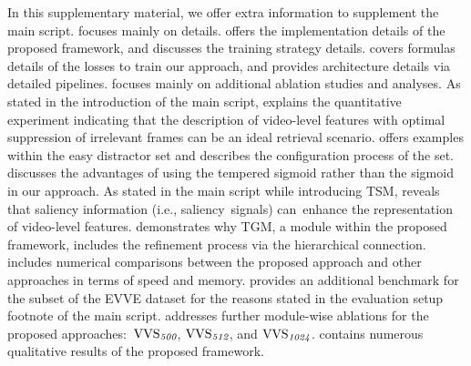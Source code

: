 \documentclass[10pt,twocolumn,letterpaper]{article}
\begin{document}
{\small


}

\clearpage

\appendix

\setcounter{figure}{0}
\setcounter{equation}{0}
\setcounter{table}{0}

\renewcommand\thefigure{\Alph{figure}}
\renewcommand\theequation{\roman{equation}}
\renewcommand\thetable{\Alph{table}}


\maketitle

In this supplementary material, we offer extra information to supplement the main script.  focuses mainly on details.  offers the implementation details of the proposed framework, and  discusses the training strategy details.  covers formulas details of the losses to train our approach, and  provides architecture details via detailed pipelines.  focuses mainly on additional ablation studies and analyses. As stated in the introduction of the main script,  explains the quantitative experiment indicating that the description of video-level features with optimal suppression of irrelevant frames can be an ideal retrieval scenario.  offers examples within the easy distractor set and describes the configuration process of the set.  discusses the advantages of using the tempered sigmoid rather than the sigmoid in our approach. As stated in the main script while introducing TSM,  reveals that saliency information (i.e., saliency signals) can enhance the representation of video-level features.  demonstrates why TGM, a module within the proposed framework, includes the refinement process via the hierarchical connection.  includes numerical comparisons between the proposed approach and other approaches in terms of speed and memory.  provides an additional benchmark for the subset of the EVVE dataset for the reasons stated in the evaluation setup footnote of the main script.  addresses further module-wise ablations for the proposed approaches:~$\textup{VVS}_{\textit{500}}$, $\textup{VVS}_{\textit{512}}$, and $\textup{VVS}_{\textit{1024}}$.  contains numerous qualitative results of the proposed framework.
\end{document}
